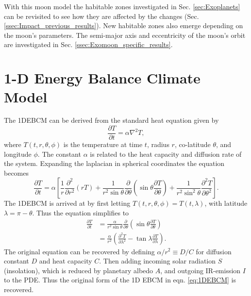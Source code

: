 \documentclass[12pt, onecolumn]{revtex4-2}    %
\newcommand{\partialderiv}[2]{\frac{\partial {#1}}{\partial {#2}}}
\newcommand{\partialderivsecnd}[2]{\frac{\partial^2 {#1}}{\partial {#2}^2}}
\begin{document}
With this moon model the habitable zones investigated in Sec. \ref{sec:Exoplanets} can be revisited to see how they are affected by the changes (Sec. \ref{ssec:Impact_previous_results}).
New habitable zones also emerge depending on the moon's parameters.
The semi-major axis and eccentricity of the moon's orbit are investigated in Sec. \ref{ssec:Exomoon_specific_results}.

\section{1-D Energy Balance Climate Model}\label{sec:1DEBCM}
%
The 1DEBCM can be derived from the standard heat equation given by
\begin{equation}
  \partialderiv{T}{t} = \alpha \nabla^2 T,
  \label{eq:heat_eqn}
\end{equation}
where $T(t, r, \theta, \phi)$ is the temperature at time $t$, radius $r$, co-latitude $\theta$, and longitude $\phi$.
The constant $\alpha$ is related to the heat capacity and diffusion rate of the system.
Expanding the laplacian in spherical coordinates the equation becomes
\begin{equation}
  \partialderiv{T}{t} = \alpha \left[\frac{1}{r} \partialderivsecnd{}{r} (r T)
    + \frac{1}{r^2 \sin\theta} \partialderiv{}{\theta}\left(\sin\theta \partialderiv{T}{\theta}\right)
    + \frac{1}{r^2 \sin^2\theta} \partialderivsecnd{T}{\theta} \right]. 
    \label{eq:FullyExpandedHeatEqn}
\end{equation}
The 1DEBCM is arrived at by first letting $T(t, r, \theta, \phi) = T(t, \lambda)$, with latitude $\lambda = \pi - \theta$. Thus the equation simplifies to
\begin{equation}
  \begin{split}
    \partialderiv{T}{t} & = \frac{\alpha}{r^2 \sin\theta} \partialderiv{}{\theta}\left(\sin\theta \partialderiv{T}{\theta}\right)   \\
                        & = \frac{\alpha}{r^2} \left(\partialderivsecnd{T}{\lambda} - \tan\lambda \partialderiv{T}{\lambda}\right).
  \end{split}
  \label{eq:1DEBCM_kernel}
\end{equation}
The original equation can be recovered by defining $\alpha / r^2 \equiv D / C$ for diffusion constant $D$ and heat capacity $C$.
Then adding incoming solar radiation $S$ (insolation), which is reduced by planetary albedo $A$, and outgoing IR-emission $I$ to the PDE.
Thus the original form of the 1D EBCM in eqn. \eqref{eq:1DEBCM} is recovered.
\end{document}
